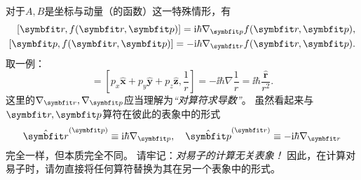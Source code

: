 对于$A,B$是坐标与动量（的函数）这一特殊情形，有
\begin{equation}
\begin{aligned}
    \relax
    [\rr, f(\rr,\pp)] = \ii\hbar\nabla_{\pp} f(\rr,\pp), \\
    [\pp, f(\rr,\pp)] = -\ii\hbar\nabla_{\rr} f(\rr,\pp).
\end{aligned}
\end{equation}
取一例：
\begin{equation}
    [\pp, \frac{1}{r}] = [p_x \hat{\bm{x}} + p_y \hat{\bm{y}} + p_z \hat{\bm{z}}, \frac{1}{r}] = -\ii\hbar \nabla \frac{1}{r} = \ii\hbar \frac{\hat{\bm{r}}}{r^2}.
\end{equation}
这里的$\nabla_{\rr}, \nabla_{\pp}$应当理解为\emph{``对算符求导数''}。
虽然看起来与$\rr,\pp$算符在彼此的表象中的形式
\begin{equation}
    \hat{\rr}^{(\pp)}\equiv\ii\hbar\nabla_{\pp},
    \quad \hat{\pp}^{(\rr)}\equiv-\ii\hbar\nabla_{\rr}
\end{equation}
完全一样，但本质完全不同。
请牢记：\emph{对易子的计算无关表象！}
因此，在计算对易子时，请勿直接将任何算符替换为其在另一个表象中的形式。


